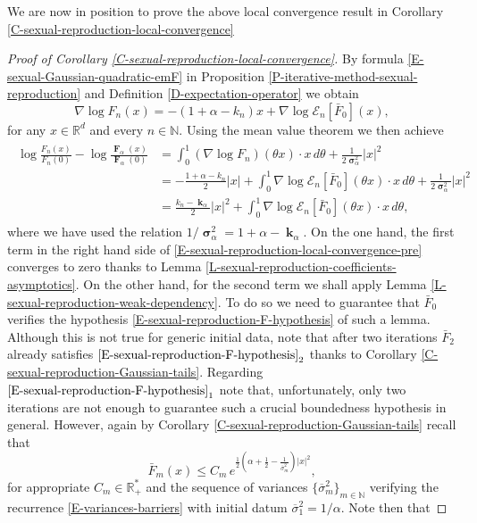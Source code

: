 \documentclass[reqno]{amsart}
\DeclareMathOperator{\bsigma}{\boldsymbol{\sigma}}
\DeclareMathOperator{\bF}{\boldsymbol{F}}
\DeclareMathOperator{\bk}{\boldsymbol{k}}
\numberwithin{equation}{section}
\begin{document}
{We are now in position to prove the above local convergence result in Corollary \ref{C-sexual-reproduction-local-convergence}

\begin{proof}[Proof of Corollary \ref{C-sexual-reproduction-local-convergence}]
By formula \eqref{E-sexual-Gaussian-quadratic-emF} in Proposition \ref{P-iterative-method-sexual-reproduction} and Definition \ref{D-expectation-operator} we obtain
$$\nabla\log F_n(x)=-(1+\alpha-k_n)x+\nabla\log \mathcal{E}_n[\bar F_0](x),$$
for any $x\in \mathbb{R}^d$ and every $n\in \mathbb{N}$. Using the mean value theorem we then achieve
\begin{align}\label{E-sexual-reproduction-local-convergence-pre}
\begin{aligned}
\log \frac{F_n(x)}{F_n(0)}-\log\frac{\bF_\alpha(x)}{\bF_\alpha(0)}&=\int_0^1(\nabla\log F_n)(\theta x)\cdot x\,d\theta+\frac{1}{2\bsigma_\alpha^2}\vert x\vert^2\\
&=-\frac{1+\alpha-k_n}{2}\vert x\vert+\int_0^1\nabla\log\mathcal{E}_n[\bar F_0](\theta x)\cdot x\,d\theta+\frac{1}{2\bsigma_\alpha^2}\vert x\vert^2\\
&=\frac{k_n-\bk_\alpha}{2}\vert x\vert^2+\int_0^1\nabla\log\mathcal{E}_n[\bar F_0](\theta x)\cdot x\,d\theta,
\end{aligned}
\end{align}
where we have used the relation $1/\bsigma_\alpha^2=1+\alpha-\bk_\alpha$. On the one hand, the first term in the right hand side of \eqref{E-sexual-reproduction-local-convergence-pre} converges to zero thanks to Lemma \ref{L-sexual-reproduction-coefficients-asymptotics}. On the other hand, for the second term we shall apply Lemma \ref{L-sexual-reproduction-weak-dependency}. To do so we need to guarantee that $\bar F_0$ verifies the hypothesis \eqref{E-sexual-reproduction-F-hypothesis} of such a lemma. Although this is not true for generic initial data, note that after two iterations $\bar F_2$ already satisfies $\eqref{E-sexual-reproduction-F-hypothesis}_2$ thanks to Corollary \ref{C-sexual-reproduction-Gaussian-tails}. Regarding $\eqref{E-sexual-reproduction-F-hypothesis}_1$ note that, unfortunately, only two iterations are not enough to guarantee such a crucial boundedness hypothesis in general. However, again by Corollary \ref{C-sexual-reproduction-Gaussian-tails} recall that
$$\bar F_{m}(x)\leq C_{m}\,e^{\frac{1}{2}\left(\alpha+\frac{1}{2}-\frac{1}{\overline{\sigma}_{m}^2}\right)\vert x\vert^2},$$
for appropriate $C_m\in \mathbb{R}_+^*$ and  the sequence of variances $\{\overline{\sigma}_m^2\}_{m\in \mathbb{N}}$ verifying the recurrence \eqref{E-variances-barriers} with initial datum $\overline{\sigma}_1^2=1/\alpha.$ Note then that

\end{proof}}
\end{document}
